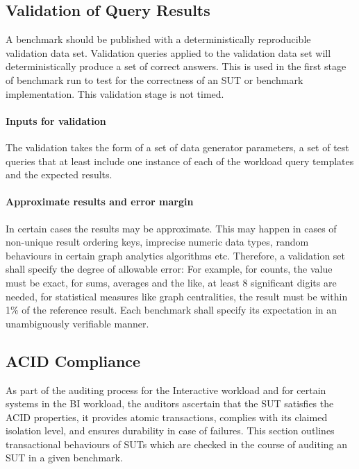 
\subsection{Validation of Query Results}
\label{sec:validation}
A benchmark should be published with a deterministically reproducible validation data set. Validation queries applied to the validation data set will deterministically produce a set of correct answers. This is used in the first stage of benchmark run to test for the correctness of an SUT or benchmark implementation. This validation stage is not timed.

\paragraph{Inputs for validation}
The validation takes the form of a set of data generator parameters, a set of test queries that at least include one instance of each of the workload query templates and the expected results.

\paragraph{Approximate results and error margin}
In certain cases the results may be approximate. This may happen in cases of non-unique result ordering keys, imprecise numeric data types, random behaviours in certain graph analytics algorithms etc. Therefore, a validation set shall specify the degree of allowable error: For example, for counts, the value must be exact, for sums, averages and the like, at least 8 significant digits are needed, for statistical measures like graph centralities, the result must be within 1\% of the reference result. Each benchmark shall specify its expectation in an unambiguously verifiable manner.

\subsection{ACID Compliance}
\label{sec:acid-compliance}

As part of the auditing process for the Interactive workload and for certain systems in the BI workload, the auditors ascertain that the SUT satisfies the ACID properties,
\ie it provides atomic transactions, complies with its claimed isolation level, and ensures durability in case of failures.
This section outlines transactional behaviours of SUTs which are checked in the course of auditing an SUT in a given benchmark.

